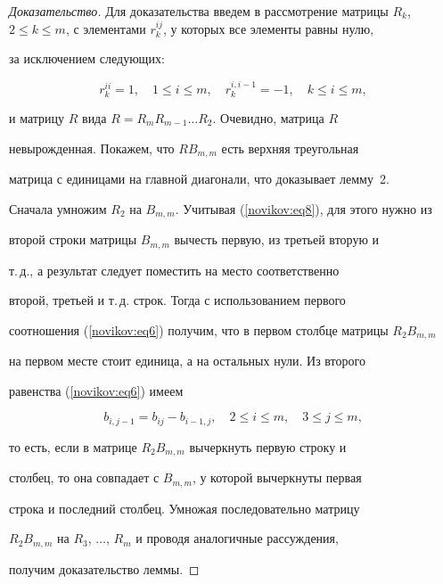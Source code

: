 \begin{proof}[Доказательство]

Для доказательства введем в рассмотрение матрицы  $R_k$, $2 \leq k \leq m$, с элементами $r^{ij}_k$, у которых все элементы равны нулю,

за  исключением следующих:

\begin{equation}

\label{novikov:eq8}

r^{ii}_k =1, \quad 1\leq i\leq m, \quad r^{i,i-1}_k =-1,\quad  k \leq i \leq m,

\end{equation}

и матрицу $R$ вида $R=R_mR_{m-1}\ldots R_2$. Очевидно, матрица $R$

невырожденная. Покажем, что $RB_{m,m}$ есть верхняя треугольная

матрица с единицами на главной диагонали, что доказывает лемму~2.



Сначала умножим $R_2$ на $B_{m,m}$. Учитывая (\ref{novikov:eq8}), для этого нужно из

второй строки матрицы  $B_{m,m}$ вычесть первую, из третьей вторую и

т.\,д., а результат следует поместить на место соответственно

второй, третьей и т.\,д. строк. Тогда с использованием первого

соотношения (\ref{novikov:eq6}) получим, что в первом столбце матрицы $R_2B_{m,m}$

на первом месте стоит единица, а на остальных нули. Из второго

равенства (\ref{novikov:eq6}) имеем

\begin{equation*}

b_{i,j-1}=b_{ij}-b_{i-1,j}, \quad 2 \leq i \leq m, \quad 3\leq j\leq m,

\end{equation*}

то есть, если в матрице $R_2B_{m,m}$ вычеркнуть первую  строку и

столбец, то она совпадает с $B_{m,m}$, у которой вычеркнуты первая

строка и последний столбец. Умножая последовательно матрицу

$R_2B_{m,m}$ на $R_3$, $\ldots$, $R_m$ и проводя аналогичные рассуждения,

получим доказательство леммы.

\end{proof}



